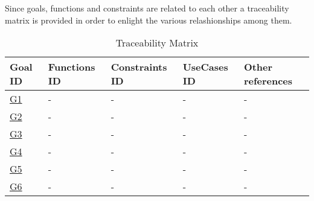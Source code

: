 Since goals, functions and constraints are related to each other a traceability matrix is provided in order to enlight the various relashionships among them.
\begin{flushleft}

\begin{table}[htp]

\begin{tabular}{l|l|l|l|l|}
\hline
\hline
Goal ID&Functions ID&Constraints ID&UseCases ID&Other references\\
\hline
\hline
\hyperlink{G1}{G1}&-&-&-&-\\
\hline
\hyperlink{G2}{G2}&-&-&-&-\\
\hline
\hyperlink{G3}{G3}&-&-&-&-\\
\hline
\hyperlink{G4}{G4}&-&-&-&-\\
\hline
\hyperlink{G5}{G5}&-&-&-&-\\
\hline
\hyperlink{G6}{G6}&-&-&-&-\\
\hline

\end{tabular}

\caption{Traceability Matrix} 

\end{table}

\end{flushleft}